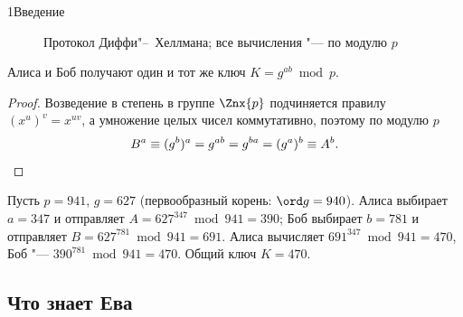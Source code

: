 \begin{lecture}{1}{Введение}
\begin{figure}[ht]
\centering
{}
\caption{Протокол Диффи"--~Хеллмана; все вычисления "--- по модулю $p$}
\label{l1:fig-dh}
\end{figure}

\begin{proposition}[корректность]\label{l1:dh-correct}
Алиса и Боб получают один и тот же ключ $K = g^{ab} \bmod p$.
\end{proposition}

\begin{proof}
Возведение в степень в группе $\Znx{p}$ подчиняется правилу $(x^u)^v = x^{uv}$, а
умножение целых чисел коммутативно, поэтому по модулю $p$
\[
  B^a \equiv (g^b)^a = g^{ab} = g^{ba} = (g^a)^b \equiv A^b. \qedhere
\]
\end{proof}

\begin{example}\label{l1:dh-example}
Пусть $p = 941$, $g = 627$ (первообразный корень: $\ord g = 940$). Алиса выбирает $a = 347$ и
отправляет $A = 627^{347} \bmod 941 = 390$; Боб выбирает $b = 781$ и отправляет
$B = 627^{781} \bmod 941 = 691$. Алиса вычисляет $691^{347} \bmod 941 = 470$, Боб "---
$390^{781} \bmod 941 = 470$. Общий ключ $K = 470$.
\end{example}

\subsection{Что знает Ева}


\end{lecture}
